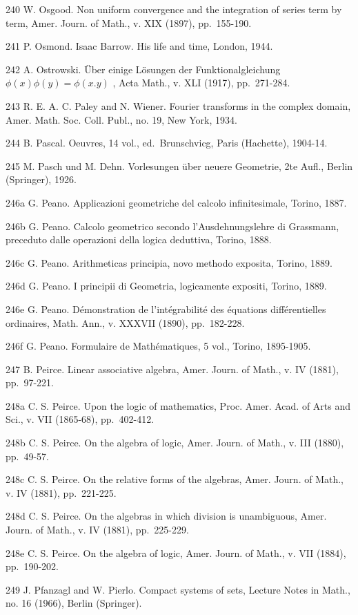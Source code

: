 240 W. Osgood. Non uniform convergence and the integration of series term by term, Amer. Journ. of Math., v. XIX (1897), pp.~155-190.

241 P. Osmond. Isaac Barrow. His life and time, London, 1944.

242 A. Ostrowski. Über einige Lösungen der Funktionalgleichung \(\phi(x)\phi(y) = \phi(x.y)\) , Acta Math., v. XLI (1917), pp.~271-284.

243 R. E. A. C. Paley and N. Wiener. Fourier transforms in the complex domain, Amer. Math. Soc. Coll. Publ., no. 19, New York, 1934.

244 B. Pascal. Oeuvres, 14 vol., ed.~Brunschvicg, Paris (Hachette), 1904-14.

245 M. Pasch und M. Dehn. Vorlesungen über neuere Geometrie, 2te Aufl., Berlin (Springer), 1926.

246a G. Peano. Applicazioni geometriche del calcolo infinitesimale, Torino, 1887.

246b G. Peano. Calcolo geometrico secondo l'Ausdehnungslehre di Grassmann, preceduto dalle operazioni della logica deduttiva, Torino, 1888.

246c G. Peano. Arithmeticas principia, novo methodo exposita, Torino, 1889.

246d G. Peano. I principii di Geometria, logicamente expositi, Torino, 1889.

246e G. Peano. Démonstration de l'intégrabilité des équations différentielles ordinaires, Math. Ann., v. XXXVII (1890), pp.~182-228.

246f G. Peano. Formulaire de Mathématiques, 5 vol., Torino, 1895-1905.

247 B. Peirce. Linear associative algebra, Amer. Journ. of Math., v. IV (1881), pp.~97-221.

248a C. S. Peirce. Upon the logic of mathematics, Proc. Amer. Acad. of Arts and Sci., v. VII (1865-68), pp.~402-412.

248b C. S. Peirce. On the algebra of logic, Amer. Journ. of Math., v. III (1880), pp.~49-57.

248c C. S. Peirce. On the relative forms of the algebras, Amer. Journ. of Math., v. IV (1881), pp.~221-225.

248d C. S. Peirce. On the algebras in which division is unambiguous, Amer. Journ. of Math., v. IV (1881), pp.~225-229.

248e C. S. Peirce. On the algebra of logic, Amer. Journ. of Math., v. VII (1884), pp.~190-202.

249 J. Pfanzagl and W. Pierlo. Compact systems of sets, Lecture Notes in Math., no. 16 (1966), Berlin (Springer).

